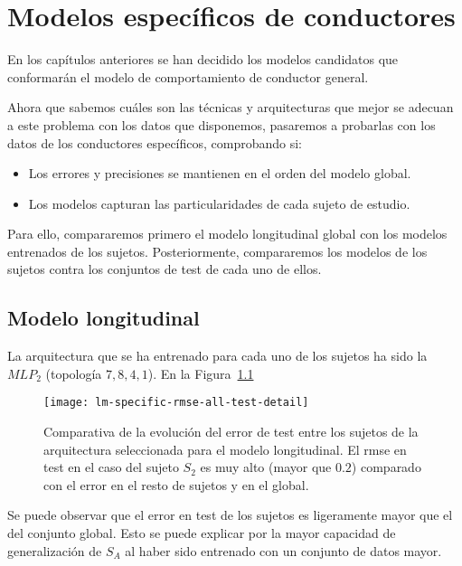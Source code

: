 \chapter{Modelos específicos de conductores}
\label{ch:specific-models}

En los capítulos anteriores se han decidido los modelos candidatos que conformarán el modelo de comportamiento de conductor general.

Ahora que sabemos cuáles son las técnicas y arquitecturas que mejor se adecuan a este problema con los datos que disponemos, pasaremos a probarlas con los datos de los conductores específicos, comprobando si:

\begin{itemize}
	\item Los errores y precisiones se mantienen en el orden del modelo global.
	\item Los modelos capturan las particularidades de cada sujeto de estudio.
\end{itemize}

Para ello, compararemos primero el modelo longitudinal global con los modelos entrenados de los sujetos. Posteriormente, compararemos los modelos de los sujetos contra los conjuntos de test de cada uno de ellos.

\section{Modelo longitudinal}

La arquitectura que se ha entrenado para cada uno de los sujetos ha sido la $MLP_2$ (topología $7, 8, 4, 1$). En la Figura~\ref{fig:lm-specific-training-validation-and-test-comparison} 

\begin{figure}[!b]
	\centering
	\texttt{[image: lm-specific-rmse-all-test-detail]}
	\caption[Comparativa de la evolución del \gls{rmse} error de test entre los sujetos de la arquitectura seleccionada para el modelo longitudinal]{Comparativa de la evolución del error de test entre los sujetos de la arquitectura seleccionada para el modelo longitudinal. El \gls{rmse} en test en el caso del sujeto $S_2$ es muy alto (mayor que $0.2$) comparado con el error en el resto de sujetos y en el global.}
	\label{fig:lm-specific-training-validation-and-test-comparison}
\end{figure}

Se puede observar que el error en test de los sujetos es ligeramente mayor que el del conjunto global. Esto se puede explicar por la mayor capacidad de generalización de $S_A$ al haber sido entrenado con un conjunto de datos mayor.


